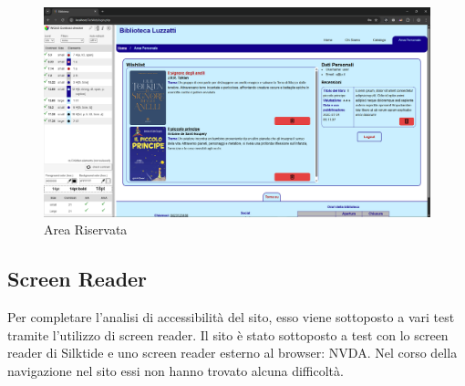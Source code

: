 \documentclass{article}
\begin{document}
\begin{figure}[H]
    \centering
    \includegraphics[width=\textwidth]{img/area_riservata.png}
    \caption{Area Riservata}
    \label{fig:area_riservata.png}
\end{figure}


\subsection{Screen Reader}
Per completare l'analisi di accessibilità del sito, esso viene sottoposto a vari test tramite l'utilizzo di screen reader. Il sito è stato sottoposto a test con lo screen reader di Silktide e uno screen reader esterno al browser: NVDA. Nel corso della navigazione nel sito essi non hanno trovato alcuna difficoltà.
\end{document}
